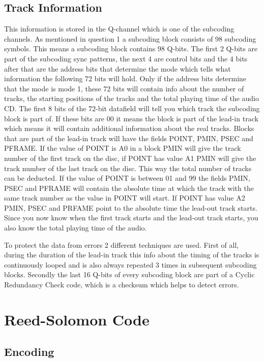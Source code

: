 \documentclass[11pt,a4paper]{article}
\begin{document}
\subsection{Track Information}
This information is stored in the Q-channel which is one of the subcoding channels. As mentioned in question 1 a subcoding block consists of 98 subcoding symbols. This means a subcoding block contains 98 Q-bits. The first 2 Q-bits are part of the subcoding sync patterns, the next 4 are control bits and the 4 bits after that are the address bits that determine the mode which tells what information the following 72 bits will hold. Only if the address bits determine that the mode is mode 1, these 72 bits will contain info about the number of tracks, the starting positions of the tracks and the total playing time of the audio CD. The first 8 bits of the 72-bit datafield will tell you which track the subcoding block is part of. If these bits are 00 it means the block is part of the lead-in track which means it will contain additional information about the real tracks. Blocks that are part of the lead-in track will have the fields POINT, PMIN, PSEC and PFRAME. If the value of POINT is A0 in a block PMIN will give the track number of the first track on the disc, if POINT has value A1 PMIN will give the track number of the last track on the disc. This way the total number of tracks can be deducted. If the value of POINT is between 01 and 99 the fields PMIN, PSEC and PFRAME will contain the absolute time at which the track with the same track number as the value in POINT will start. If POINT has value A2 PMIN, PSEC and PRFAME point to the absolute time the lead-out track starts. Since you now know when the first track starts and the lead-out track starts, you also know the total playing time of the audio.

To protect the data from errors 2 different techniques are used. First of all, during the duration of the lead-in track this info about the timing of the tracks is continuously looped and is also always repeated 3 times in subsequent subcoding blocks. Secondly the last 16 Q-bits of every subcoding block are part of a Cyclic Redundancy Check code, which is a checksum which helps to detect errors.

\section{Reed-Solomon Code}

\subsection{Encoding}
\end{document}
